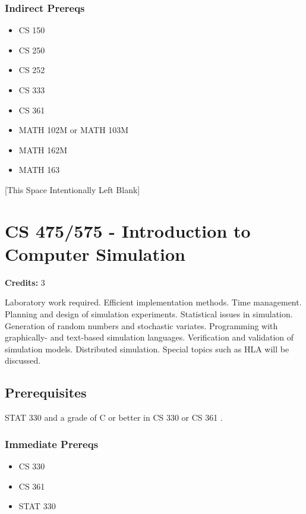 \documentclass[]{article}
\providecommand{\tightlist}{%
  \setlength{\itemsep}{0pt}\setlength{\parskip}{0pt}}
\newcommand{\pagebreakhere}{
\vspace*{\fill}
\begin{center}
[This Space Intentionally Left Blank]
\end{center}
\vspace*{\fill}
\newpage
}
\begin{document}
\subsubsection{Indirect Prereqs}\label{indirect-prereqs-35}

\begin{itemize}
\tightlist
\item
  CS 150
\item
  CS 250
\item
  CS 252
\item
  CS 333
\item
  CS 361
\item
  MATH 102M or MATH 103M
\item
  MATH 162M
\item
  MATH 163
\end{itemize}

\pagebreakhere
\section{CS 475/575 - Introduction to Computer
Simulation}\label{cs-475575---introduction-to-computer-simulation}

\textbf{Credits:} 3

Laboratory work required. Efficient implementation methods. Time
management. Planning and design of simulation experiments. Statistical
issues in simulation. Generation of random numbers and stochastic
variates. Programming with graphically- and text-based simulation
languages. Verification and validation of simulation models. Distributed
simulation. Special topics such as HLA will be discussed.

\subsection{Prerequisites}\label{prerequisites-45}

STAT 330 and a grade of C or better in CS 330 or CS 361 .

\subsubsection{Immediate Prereqs}\label{immediate-prereqs-36}

\begin{itemize}
\tightlist
\item
  CS 330
\item
  CS 361
\item
  STAT 330
\end{itemize}
\end{document}
